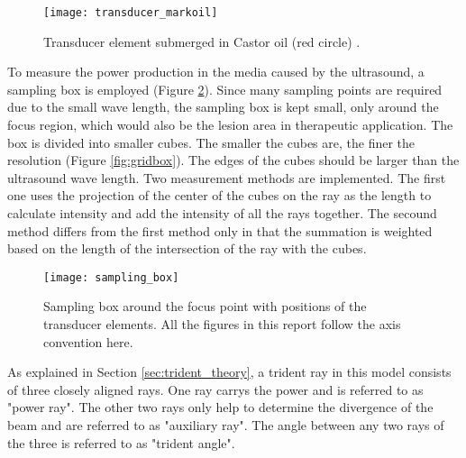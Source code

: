 \begin{figure}[h]
    \centering
    \texttt{[image: transducer\_markoil]}
    \caption{Transducer element submerged in Castor oil (red circle) \cite{sonalleve} \cite{vanwijk2013}.}
    \label{fig:submerged_transducer}
\end{figure}

To measure the power production in the media caused by the ultrasound, a sampling box is employed (Figure \ref{fig:sampling_box}). Since many sampling points are required due to the small wave length, the sampling box is kept small, only around the focus region, which would also be the lesion area in therapeutic application. The box is divided into smaller cubes. The smaller the cubes are, the finer the resolution (Figure \ref{fig:gridbox}). The edges of the cubes should be larger than the ultrasound wave length. Two measurement methods are implemented. The first one uses the projection of the center of the cubes on the ray as the length to calculate intensity and add the intensity of all the rays together. The secound method differs from the first method only in that the summation is weighted based on the length of the intersection of the ray with the cubes.

\begin{figure}[h]
    \centering
    \texttt{[image: sampling\_box]}
    \caption{Sampling box around the focus point with positions of the transducer elements. All the figures in this report follow the axis convention here.}
    \label{fig:sampling_box}
\end{figure}

As explained in Section \ref{sec:trident_theory}, a trident ray in this model consists of three closely aligned rays. One ray carrys the power and is referred to as "power ray". The other two rays only help to determine the divergence of the beam and are referred to as "auxiliary ray". The angle between any two rays of the three is referred to as "trident angle".

